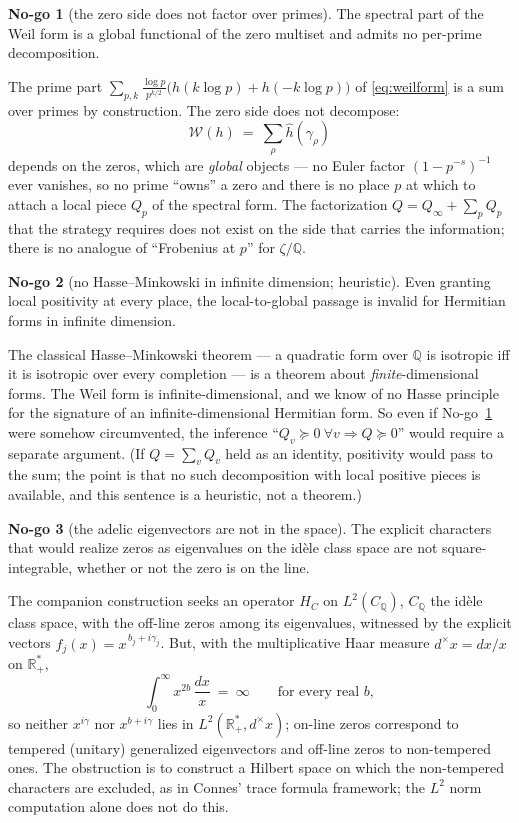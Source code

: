 \documentclass[11pt]{amsart}
\theoremstyle{definition}
\theoremstyle{remark}
\theoremstyle{definition}
\newtheorem{nogo}{No-go}[section]
\newcommand{\cW}{\mathcal{W}}
\newcommand{\R}{\mathbb{R}}
\begin{document}
\begin{nogo}[the zero side does not factor over primes]\label{ng:nofactor}
The spectral part of the Weil form is a global functional of the zero multiset and admits no per-prime
decomposition.
\end{nogo}
\noindent The prime part $\sum_{p,k}\frac{\log p}{p^{k/2}}\bigl(h(k\log p)+h(-k\log p)\bigr)$ of
\eqref{eq:weilform} is a sum over primes by construction. The zero side does not decompose:
\[
   \cW(h)\ =\ \sum_\rho\widehat h(\gamma_\rho)
\]
depends on the zeros, which are \emph{global} objects --- no Euler factor $(1-p^{-s})^{-1}$ ever vanishes,
so no prime ``owns'' a zero and there is no place $p$ at which to attach a local piece $Q_p$ of the spectral
form. The factorization $Q=Q_\infty+\sum_pQ_p$ that the strategy requires does not exist on the side that
carries the information; there is no analogue of ``Frobenius at $p$'' for $\zeta/\mathbb Q$.

\begin{nogo}[no Hasse--Minkowski in infinite dimension; heuristic]\label{ng:hm}
Even granting local positivity at every place, the local-to-global passage is invalid for Hermitian forms
in infinite dimension.
\end{nogo}
\noindent The classical Hasse--Minkowski theorem --- a quadratic form over $\mathbb Q$ is isotropic iff it
is isotropic over every completion --- is a theorem about \emph{finite}-dimensional forms. The Weil form is
infinite-dimensional, and we know of no Hasse principle for the signature of an infinite-dimensional
Hermitian form. So even if No-go~\ref{ng:nofactor} were
somehow circumvented, the inference ``$Q_v\succeq0\ \forall v\Rightarrow Q\succeq0$'' would require a
separate argument. (If $Q=\sum_vQ_v$ held as an identity, positivity would pass to the sum; the point is
that no such decomposition with local positive pieces is available, and this sentence is a heuristic, not
a theorem.)

\begin{nogo}[the adelic eigenvectors are not in the space]\label{ng:l2}
The explicit characters that would realize zeros as eigenvalues on the id\`ele class space are not
square-integrable, whether or not the zero is on the line.
\end{nogo}
\noindent The companion construction seeks an operator $H_C$ on $L^2(C_{\mathbb Q})$, $C_{\mathbb Q}$ the
id\`ele class space, with the off-line zeros among its eigenvalues, witnessed by the explicit vectors
$f_j(x)=x^{\,b_j+i\gamma_j}$. But, with the multiplicative Haar measure $d^\times x=dx/x$ on $\R_+^*$,
\[
   \int_0^\infty x^{2b}\,\frac{dx}{x}\ =\ \infty\qquad\text{for every real }b,
\]
so neither $x^{i\gamma}$ nor $x^{b+i\gamma}$ lies in $L^2(\R_+^*,d^\times x)$; on-line zeros correspond to
tempered (unitary) generalized eigenvectors and off-line zeros to non-tempered ones. The obstruction is to
construct a Hilbert space on which the non-tempered characters are excluded, as in Connes' trace formula
framework; the $L^2$ norm computation alone does not do this.
\end{document}
